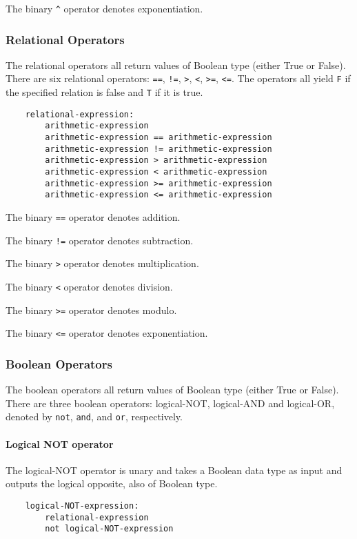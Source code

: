 \documentclass[12pt]{article}
\begin{document}
The binary \lstinline{^} operator denotes exponentiation.

\subsubsection{Relational Operators}
The relational operators all return values of Boolean type (either True or False). There are six relational operators:  \lstinline{==}, \lstinline{!=}, \lstinline{>}, \lstinline{<}, \lstinline{>=}, \lstinline{<=}. The operators  all yield \lstinline{F} if the specified relation is false and \lstinline{T} if it is true.
\begin{lstlisting}
    relational-expression:
        arithmetic-expression
        arithmetic-expression == arithmetic-expression
        arithmetic-expression != arithmetic-expression
        arithmetic-expression > arithmetic-expression
        arithmetic-expression < arithmetic-expression
        arithmetic-expression >= arithmetic-expression
        arithmetic-expression <= arithmetic-expression
\end{lstlisting}

The binary \lstinline{==} operator denotes addition.

The binary \lstinline{!=} operator denotes subtraction.

The binary \lstinline{>} operator denotes multiplication.

The binary \lstinline{<} operator denotes division.

The binary \lstinline{>=} operator denotes modulo.

The binary \lstinline{<=} operator denotes exponentiation.

\subsubsection{Boolean Operators}
The boolean operators all return values of Boolean type (either True or False). There are three boolean operators: logical-NOT, logical-AND and logical-OR, denoted by \lstinline{not}, \lstinline{and},  and \lstinline{or}, respectively.
\paragraph{Logical NOT operator}
The logical-NOT operator is unary and takes a Boolean data type as input and outputs the logical opposite, also of Boolean type.
\begin{lstlisting}
    logical-NOT-expression:
        relational-expression
        not logical-NOT-expression
\end{lstlisting}
\end{document}

